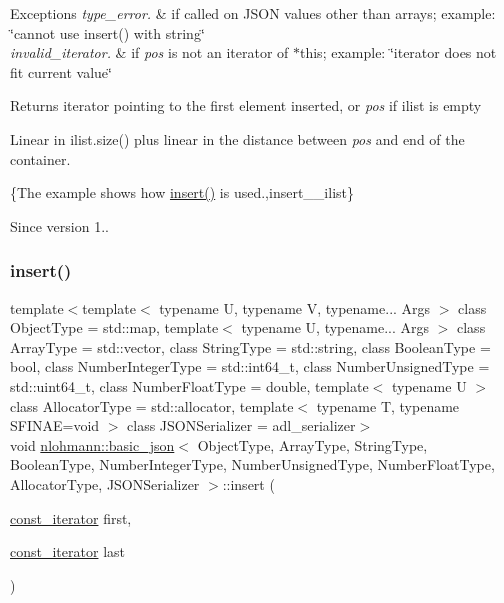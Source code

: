 \begin{DoxyExceptions}{Exceptions}
{\em type\+\_\+error.} & if called on J\+S\+ON values other than arrays; example\+: {\ttfamily \char`\"{}cannot use insert() with string\char`\"{}} \\
\hline
{\em invalid\+\_\+iterator.} & if {\itshape pos} is not an iterator of $\ast$this; example\+: {\ttfamily \char`\"{}iterator does not fit current value\char`\"{}}\\
\hline
\end{DoxyExceptions}
\begin{DoxyReturn}{Returns}
iterator pointing to the first element inserted, or {\itshape pos} if {\ttfamily ilist} is empty
\end{DoxyReturn}
Linear in {\ttfamily ilist.\+size()} plus linear in the distance between {\itshape pos} and end of the container.

\{The example shows how {\ttfamily \mbox{\hyperlink{classnlohmann_1_1basic__json_a0136728f5db69d4051c77b94307abd6c}{insert()}}} is used.,insert\+\_\+\+\_\+ilist\}

\begin{DoxySince}{Since}
version 1.. 
\end{DoxySince}
\mbox{\label{classnlohmann_1_1basic__json_a1b0a4e60d56f1fe80501ed941e122892}} 
\subsubsection{\texorpdfstring{insert()}{insert()}\hspace{0.1cm}{\footnotesize\ttfamily [6/6]}}
{\footnotesize\ttfamily template$<$template$<$ typename U, typename V, typename... Args $>$ class Object\+Type = std\+::map, template$<$ typename U, typename... Args $>$ class Array\+Type = std\+::vector, class String\+Type  = std\+::string, class Boolean\+Type  = bool, class Number\+Integer\+Type  = std\+::int64\+\_\+t, class Number\+Unsigned\+Type  = std\+::uint64\+\_\+t, class Number\+Float\+Type  = double, template$<$ typename U $>$ class Allocator\+Type = std\+::allocator, template$<$ typename T, typename S\+F\+I\+N\+A\+E=void $>$ class J\+S\+O\+N\+Serializer = adl\+\_\+serializer$>$ \\
void \mbox{\hyperlink{classnlohmann_1_1basic__json}{nlohmann\+::basic\+\_\+json}}$<$ Object\+Type, Array\+Type, String\+Type, Boolean\+Type, Number\+Integer\+Type, Number\+Unsigned\+Type, Number\+Float\+Type, Allocator\+Type, J\+S\+O\+N\+Serializer $>$\+::insert (\begin{DoxyParamCaption}\item[{\mbox{\hyperlink{classnlohmann_1_1basic__json_a41a70cf9993951836d129bb1c2b3126a}{const\+\_\+iterator}}}]{first,  }\item[{\mbox{\hyperlink{classnlohmann_1_1basic__json_a41a70cf9993951836d129bb1c2b3126a}{const\+\_\+iterator}}}]{last }\end{DoxyParamCaption})\hspace{0.3cm}{\ttfamily [inline]}}




